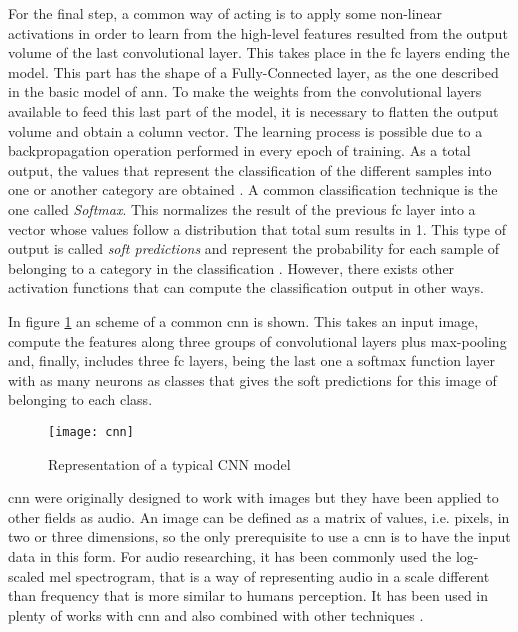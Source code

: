 	For the final step, a common way of acting is to apply some non-linear activations in order to learn from the high-level features resulted from the output volume of the last convolutional layer. This takes place in the \acrlong{fc} layers ending the model. This part has the shape of a Fully-Connected layer, as the one described in the basic model of \acrshort{ann}. To make the weights from the convolutional layers available to feed this last part of the model, it is necessary to flatten the output volume and obtain a column vector. The learning process is possible due to a backpropagation operation performed in every epoch of training. As a total output, the values that represent the classification of the different samples into one or another category are obtained \cite{Saha2018}. A common classification technique is the one called \textit{Softmax}. This normalizes the result of the previous \acrshort{fc} layer into a vector whose values follow a distribution that total sum results in 1. This type of output is called \textit{soft predictions} and represent the probability for each sample of belonging to a category in the classification \cite{Mahmood2018}. However, there exists other activation functions that can compute the classification output in other ways. 
	
	In figure \ref{fig:mesh13} an scheme of a common \acrlong{cnn} is shown. This takes an input image, compute the features along three groups of convolutional layers plus max-pooling and, finally, includes three \acrlong{fc} layers, being the last one a softmax function layer with as many neurons as classes that gives the soft predictions for this image of belonging to each class.
	
	\begin{figure}[ht]
		\centering
		\captionsetup{justification=centering}
		\texttt{[image: cnn]}
		\caption{Representation of a typical CNN model \cite{Hinz2016}}
		\label{fig:mesh13}
	\end{figure}

	\acrfull{cnn} were originally designed to work with images but they have been applied to other fields as audio. An image can be defined as a matrix of values, i.e. pixels, in two or three dimensions, so the only prerequisite to use a \acrshort{cnn} is to have the input data in this form. For audio researching, it has been commonly used the log-scaled mel spectrogram, that is a way of representing audio in a scale different than frequency that is more similar to humans perception. It has been used in plenty of works with \acrshort{cnn} and also combined with other techniques \cite{Salamon2017} \cite{Piczak2015} \cite{Kumar2017}.
	
	
	

	

	
	
	
	
	